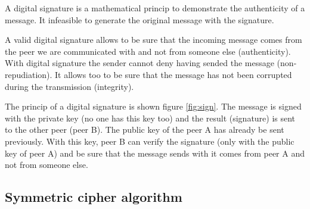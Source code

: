 A digital signature is a mathematical princip to demonstrate the authenticity of
a message.\newline
It infeasible to generate the original message with the signature.

A valid digital signature allows to be sure that the incoming message comes from
the peer we are communicated with and not from someone else
(authenticity).\newline
With digital signature the sender cannot deny having sended the message
(non-repudiation).\newline
It allows too to be sure that the message has not been corrupted during the
transmission (integrity).\newline

The princip of a digital signature is shown figure \ref{fig:sign}.\newline
The message is signed with the private key (no one has this key too) and the
result (signature) is sent to the other peer (peer B).\newline
The public key of the peer A has already be sent previously. With this key, peer
B can verify the signature (only with the public key of peer A) and be sure that
the message sends with it comes from peer A and not from someone else.


\newpage

\subsection{Symmetric cipher algorithm}
\label{intro_sym_cipher}

